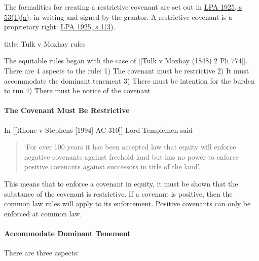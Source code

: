 \documentclass[
]{article}
\newenvironment{Shaded}{}{}
\newcommand{\NormalTok}[1]{#1}
\begin{document}
The formalities for creating a restrictive covenant are set out in
\href{https://www.legislation.gov.uk/ukpga/Geo5/15-16/20/section/53}{LPA
1925, s 53(1)(a)}: in writing and signed by the grantor. A restrictive
covenant is a proprietary right:
\href{https://www.legislation.gov.uk/ukpga/Geo5/15-16/20/section/1}{LPA
1925, s 1(3)}.

\begin{Shaded}
\begin{Highlighting}[]
\NormalTok{title: Tulk v Moxhay rules}

\NormalTok{The equitable rules began with the case of [[Tulk v Moxhay (1848) 2 Ph 774]]. There are 4 aspects to the rule:}
\NormalTok{1) The covenant must be restrictive}
\NormalTok{2) It must accommodate the dominant tenement}
\NormalTok{3) There must be intention for the burden to run}
\NormalTok{4) There must be notice of the covenant}
\end{Highlighting}
\end{Shaded}

\hypertarget{the-covenant-must-be-restrictive}{%
\paragraph{The Covenant Must Be
Restrictive}\label{the-covenant-must-be-restrictive}}

In {[}{[}Rhone v Stephens {[}1994{]} AC 310{]}{]} Lord Templemen said

\begin{quote}
`For over 100 years it has been accepted law that equity will enforce
negative covenants against freehold land but has no power to enforce
positive covenants against successors in title of the land'.
\end{quote}

This means that to enforce a covenant in equity, it must be shown that
the substance of the covenant is restrictive. If a covenant is positive,
then the common law rules will apply to its enforcement. Positive
covenants can only be enforced at common law.

\hypertarget{accommodate-dominant-tenement}{%
\paragraph{Accommodate Dominant
Tenement}\label{accommodate-dominant-tenement}}

There are three aspects:
\end{document}
